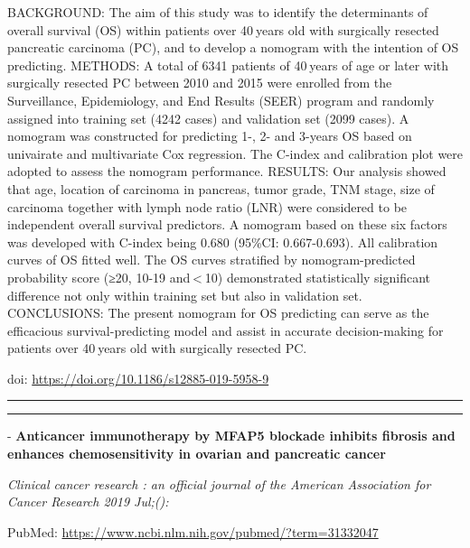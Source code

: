 \documentclass[]{article}
\begin{document}
BACKGROUND: The aim of this study was to identify the determinants of
overall survival (OS) within patients over 40 years old with surgically
resected pancreatic carcinoma (PC), and to develop a nomogram with the
intention of OS predicting. METHODS: A total of 6341 patients of
40 years of age or later with surgically resected PC between 2010 and
2015 were enrolled from the Surveillance, Epidemiology, and End Results
(SEER) program and randomly assigned into training set (4242 cases) and
validation set (2099 cases). A nomogram was constructed for predicting
1-, 2- and 3-years OS based on univairate and multivariate Cox
regression. The C-index and calibration plot were adopted to assess the
nomogram performance. RESULTS: Our analysis showed that age, location of
carcinoma in pancreas, tumor grade, TNM stage, size of carcinoma
together with lymph node ratio (LNR) were considered to be independent
overall survival predictors. A nomogram based on these six factors was
developed with C-index being 0.680 (95\%CI: 0.667-0.693). All
calibration curves of OS fitted well. The OS curves stratified by
nomogram-predicted probability score (≥20, 10-19 and \textless{} 10)
demonstrated statistically significant difference not only within
training set but also in validation set. CONCLUSIONS: The present
nomogram for OS predicting can serve as the efficacious
survival-predicting model and assist in accurate decision-making for
patients over 40 years old with surgically resected PC.

doi: \url{https://doi.org/10.1186/s12885-019-5958-9}

{}

{}

\begin{center}\rule{0.5\linewidth}{\linethickness}\end{center}

\begin{center}\rule{0.5\linewidth}{\linethickness}\end{center}

 - \textbf{Anticancer immunotherapy by MFAP5 blockade inhibits fibrosis
and enhances chemosensitivity in ovarian and pancreatic cancer}

\emph{Clinical cancer research : an official journal of the American
Association for Cancer Research 2019 Jul;():}

PubMed: \url{https://www.ncbi.nlm.nih.gov/pubmed/?term=31332047}
\end{document}
